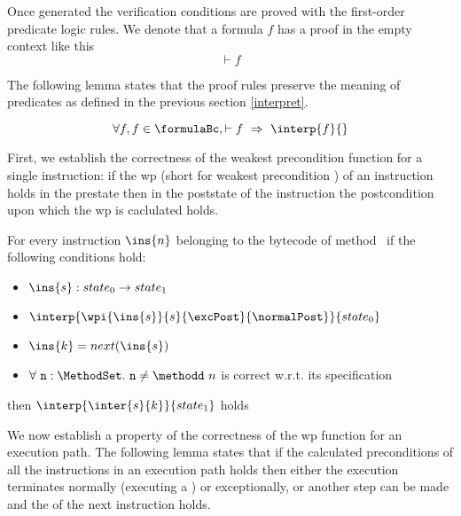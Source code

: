 Once generated the verification conditions are proved with the first-order predicate logic rules. We denote that a formula $ f $ 
has a proof in the empty context like this 
$$ \vdash f $$

The following lemma states
that the proof rules preserve the meaning of predicates as defined in the previous section \ref{interpret}.   
\begin{lemma_1}
     $$ \forall f , f \in \formulaBc,  \vdash f \ \Rightarrow \ \interp{f}{} $$
\end{lemma_1}

First, we establish the correctness of the weakest precondition function for a single instruction: if the wp (short for weakest precondition ) of an 
instruction holds in the prestate then in the poststate of the instruction the postcondition upon which the wp is caclulated holds. 



\begin{lemma0} \label{lemma0}
For every instruction $\ins{n}$ belonging to the bytecode of method \methodd \  if the following conditions hold: 
 \begin{itemize}
         \item $ \ins{s} : state_0 \rightarrow state_1$
         \item $ \interp{\wpi{\ins{s}}{s}{\excPost}{\normalPost}}{state_0} $
	 \item  $\ins{k} = next( \ins{s} ) $
         \item    $ \forall \mbox{ \rm \texttt{n}} : \MethodSet . \mbox{ \rm \texttt{n}}   \neq \methodd \ n$ is correct w.r.t. its specification
 \end{itemize}
  
  then $ \interp{\inter{s}{k}}{state_1}  $   holds
\end{lemma0}


We now establish a property of the correctness of the wp function  for an execution path. The following lemma states that if the calculated preconditions
of all the instructions in an execution path holds then either the execution terminates normally (executing a \return) or exceptionally, or 
another step can be made and the \fwpi of the next instruction holds.

